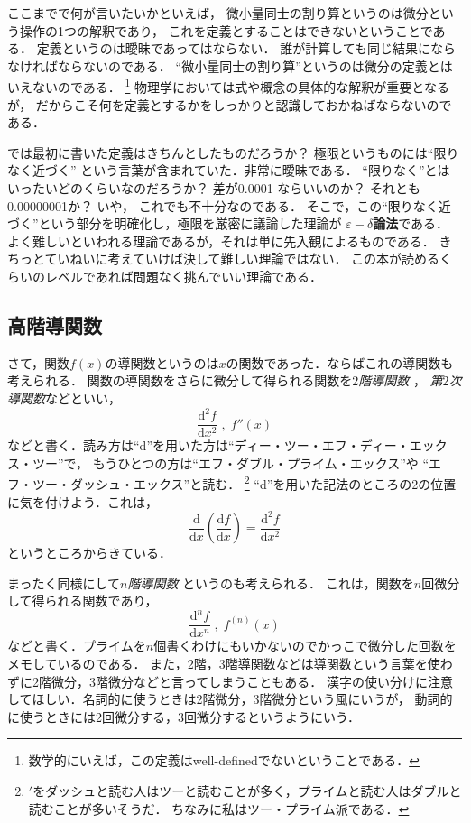 ここまでで何が言いたいかといえば，
微小量同士の割り算というのは微分という操作の1つの解釈であり，
これを定義とすることはできないということである．
定義というのは曖昧であってはならない．
誰が計算しても同じ結果にならなければならないのである．
``微小量同士の割り算''というのは微分の定義とはいえないのである．
\footnote{数学的にいえば，この定義はwell-definedでないということである．}
物理学においては式や概念の具体的な解釈が重要となるが，
だからこそ何を定義とするかをしっかりと認識しておかねばならないのである．

では最初に書いた定義はきちんとしたものだろうか？ 極限というものには``限りなく近づく''
という言葉が含まれていた．非常に曖昧である．
``限りなく''とはいったいどのくらいなのだろうか？ 差が0.0001
ならいいのか？ それとも0.00000001か？ いや，
これでも不十分なのである．
そこで，この``限りなく近づく''という部分を明確化し，極限を厳密に議論した理論が
\textbf{$\varepsilon-\delta$論法}である．
よく難しいといわれる理論であるが，それは単に先入観によるものである．
きちっとていねいに考えていけば決して難しい理論ではない．
この本が読めるくらいのレベルであれば問題なく挑んでいい理論である．
\subsection{高階導関数}
さて，関数$f(x)$の導関数というのは$x$の関数であった．ならばこれの導関数も考えられる．
関数の導関数をさらに微分して得られる関数を\emph{$2$階導関数}
，
\emph{第$2$次導関数}などといい，
$$
\frac{\mathrm{d}^2 f}{\mathrm{d} x^2} \; , \; f''(x)
$$
などと書く．読み方は``d''を用いた方は``ディー・ツー・エフ・ディー・エックス・ツー''で，
もうひとつの方は``エフ・ダブル・プライム・エックス''や
``エフ・ツー・ダッシュ・エックス''と読む．
\footnote{$'$をダッシュと読む人はツーと読むことが多く，プライムと読む人はダブルと読むことが多いそうだ．
ちなみに私はツー・プライム派である．}
``d''を用いた記法のところの2の位置に気を付けよう．これは，
$$
\frac{\mathrm{d}}{\mathrm{d}x} \left( \frac{\mathrm{d} f}{\mathrm{d} x} \right) = \frac{\mathrm{d}^2 f}{\mathrm{d} x^2}
$$
というところからきている．

まったく同様にして\emph{$n$階導関数}
というのも考えられる．
これは，関数を$n$回微分して得られる関数であり，
$$
\frac{\mathrm{d}^n f}{\mathrm{d} x^n} \; , \; f^{(n)} (x)
$$
などと書く．プライムを$n$個書くわけにもいかないのでかっこで微分した回数をメモしているのである．
また，2階，3階導関数などは導関数という言葉を使わずに2階微分，3階微分などと言ってしまうこともある．
漢字の使い分けに注意してほしい．名詞的に使うときは2階微分，3階微分という風にいうが，
動詞的に使うときには2回微分する，3回微分するというようにいう．

